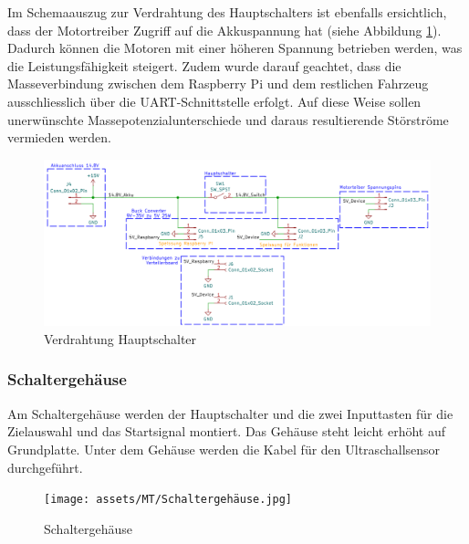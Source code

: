 Im Schemaauszug zur Verdrahtung des Hauptschalters ist ebenfalls ersichtlich, dass der Motortreiber Zugriff auf die Akkuspannung hat (siehe Abbildung \ref{fig: Verdrahtung Hauptschalter}). Dadurch können die Motoren mit einer höheren Spannung betrieben werden, was die Leistungsfähigkeit steigert. Zudem wurde darauf geachtet, dass die Masseverbindung zwischen dem Raspberry Pi und dem restlichen Fahrzeug ausschliesslich über die UART-Schnittstelle erfolgt. Auf diese Weise sollen unerwünschte Massepotenzialunterschiede und daraus resultierende Störströme vermieden werden.

\begin{figure}[H]
\centering
\includegraphics[width=\textwidth]{assets/ET/PINOUT/Speissung.png}
\caption{Verdrahtung Hauptschalter}
\label{fig: Verdrahtung Hauptschalter}
\end{figure}

\newpage
\subsubsection{Schaltergehäuse}

Am Schaltergehäuse werden der Hauptschalter und die zwei Inputtasten für die Zielauswahl und das Startsignal montiert. Das Gehäuse steht leicht erhöht auf Grundplatte. Unter dem Gehäuse werden die Kabel für den Ultraschallsensor durchgeführt.


\begin{figure}[H]
\centering
\texttt{[image: assets/MT/Schaltergehäuse.jpg]}
\caption{Schaltergehäuse}
\label{fig:Schaltergehäuse}
\end{figure}

